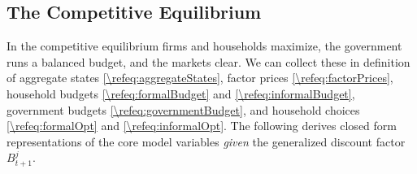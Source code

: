 \subsection{The Competitive Equilibrium}\label{\refsec:EE}
In the competitive equilibrium firms and households maximize, the government runs a balanced budget, and the markets clear. We can collect these in definition of aggregate states \eqref{\refeq:aggregateStates}, factor prices \eqref{\refeq:factorPrices}, household budgets \eqref{\refeq:formalBudget} and \eqref{\refeq:informalBudget}, government budgets \eqref{\refeq:governmentBudget}, and household choices \eqref{\refeq:formalOpt} and \eqref{\refeq:informalOpt}. The following derives closed form representations of the core model variables \emph{given} the generalized discount factor $B_{t+1}^j$. 


\bigskip
